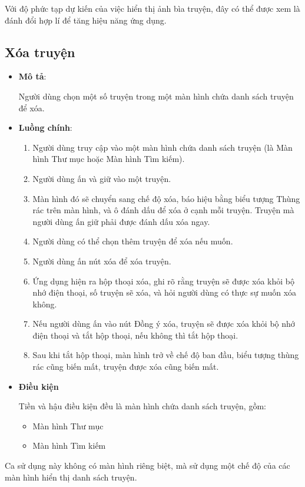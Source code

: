 \documentclass[../../thesis]{subfiles}
\begin{document}
Với độ phức tạp dự kiến của việc hiển thị ảnh bìa truyện, đây có thể được xem là
đánh đổi hợp lí để tăng hiệu năng ứng dụng.

\subsection{Xóa truyện}\label{sec:delete-comic}

\begin{itemize}
    \item
        \textbf{Mô tả}:

        Người dùng chọn một số truyện trong một màn hình chứa danh sách truyện
        để xóa.
    \item
        \textbf{Luồng chính}:

        \begin{enumerate}
            \item
                Người dùng truy cập vào một màn hình chứa danh sách truyện (là
                Màn hình Thư mục hoặc Màn hình Tìm kiếm).
            \item
                Người dùng ấn và giữ vào một truyện.
            \item
                Màn hình đó sẽ chuyển sang chế độ xóa, báo hiệu bằng biểu tượng
                Thùng rác trên màn hình, và ô đánh dấu để xóa ở cạnh mỗi truyện.
                Truyện mà người dùng ấn giữ phải được đánh dấu xóa ngay.
            \item
                Người dùng có thể chọn thêm truyện để xóa nếu muốn.
            \item
                Người dùng ấn nút xóa để xóa truyện.
            \item
                Ứng dụng hiện ra hộp thoại xóa, ghi rõ rằng truyện sẽ được xóa
                khỏi bộ nhớ điện thoại, số truyện sẽ xóa, và hỏi người dùng có
                thực sự muốn xóa không.
            \item
                Nếu người dùng ấn vào nút Đồng ý xóa, truyện sẽ được xóa khỏi bộ
                nhớ điện thoại và tắt hộp thoại, nếu không thì tắt hộp thoại.
            \item
                Sau khi tắt hộp thoại, màn hình trở về chế độ ban đầu, biểu
                tượng thùng rác cũng biến mất, truyện được xóa cũng biến mất.
        \end{enumerate}
    \item
        \textbf{Điều kiện}

        Tiền và hậu điều kiện đều là màn hình chứa danh sách truyện, gồm:

        \begin{itemize}
            \item
                Màn hình Thư mục
            \item
                Màn hình Tìm kiếm
        \end{itemize}
\end{itemize}

Ca sử dụng này không có màn hình riêng biệt, mà sử dụng một chế độ của các màn
hình hiển thị danh sách truyện.
\end{document}
